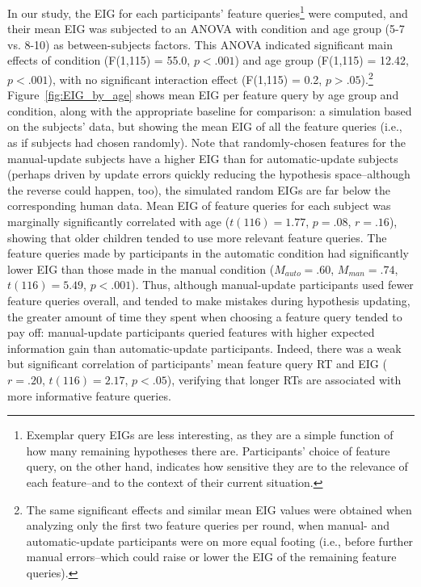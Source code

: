 \documentclass[man,floatsintext]{apa6}
\begin{document}
In our study, the EIG for each participants' feature queries\footnote{Exemplar query EIGs are 
less interesting, as they are a simple function of how many remaining hypotheses 
there are. Participants' choice of feature query, on the other hand, indicates how 
sensitive they are to the relevance of each feature--and to the context of their 
current situation.} were computed, and their mean EIG was 
subjected to an ANOVA with condition and age group (5-7 vs. 8-10) as between-subjects factors. 
This ANOVA indicated significant main effects of condition (F(1,115) = 55.0, $p<.001$) 
and age group (F(1,115) = 12.42, $p<.001$), with no significant interaction effect (F(1,115) = 0.2, $p>.05$).\footnote{The same significant effects and similar mean EIG values were obtained when analyzing only the first two feature queries per round, when manual- and automatic-update participants were on more equal footing (i.e., before further manual errors--which could raise or lower the EIG of the remaining feature queries).}
Figure~\ref{fig:EIG_by_age} shows mean EIG per feature query by age group and condition, along with the appropriate baseline for comparison: a simulation based on the subjects' data, but showing the mean EIG of all the feature queries (i.e., as if subjects had chosen randomly). Note that randomly-chosen features for the manual-update subjects have a higher EIG than for automatic-update subjects (perhaps driven by update errors quickly reducing the hypothesis space--although the reverse could happen, too), the simulated random EIGs are far below the corresponding human data.
Mean EIG of feature queries for each subject was marginally significantly correlated with 
age ($t(116)=1.77$, $p=.08$, $r=.16$), showing that older children tended to use more relevant feature queries. 
The feature queries made by participants in the 
automatic condition had significantly lower EIG than those made in the manual 
condition ($M_{auto} = .60$, $M_{man} = .74$, $t(116) = 5.49$,  $p<.001$). Thus, 
although manual-update participants used fewer feature queries overall, and tended 
to make mistakes during hypothesis updating, the greater amount of time they spent 
when choosing a feature query tended to pay off: manual-update participants 
queried features with higher expected information gain than automatic-update 
participants. Indeed, there was a weak but significant correlation of participants' mean feature query RT and EIG ($r=.20$, $t(116)=2.17$, $p<.05$), verifying that longer RTs are associated with more informative feature queries.
\end{document}
